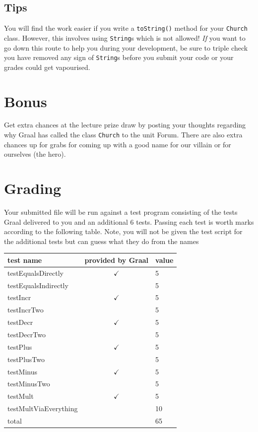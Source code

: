 \documentclass[twoside=false,DIV=14]{scrartcl}
\begin{document}
\subsection{Tips}
You will find the work easier if you write a \verb+toString()+ method for your \verb+Church+ class.  However, this involves using \verb+String+s which is not allowed!  \emph{If} you want to go down this route to help you during your development, be sure to triple check you have removed any sign of \verb+String+s before you submit your code or your grades could get vapourised.

\section{Bonus}
Get extra chances at the lecture prize draw by posting your thoughts regarding why Graal has called the class \lstinline{Church} to the unit Forum.  There are also extra chances up for grabs for coming up with a good name for our villain or for ourselves (the hero).

\section{Grading}
Your submitted file will be run against a test program consisting of the tests Graal delivered to you and an additional 6 tests.  Passing each test is worth marks according to the following table.  Note, you will not be given the test script for the additional tests but can guess what they do from the names

\begin{tabular}{lcl}
  \textbf{test name} & \textbf{provided by Graal} & \textbf{value} \\
  \hline
  testEqualsDirectly & $\checkmark$ & 5 \\
  testEqualsIndirectly & & 5 \\
  testIncr & $\checkmark$ & 5 \\
  testIncrTwo & & 5 \\
  testDecr & $\checkmark$ & 5 \\
  testDecrTwo & & 5 \\
  testPlus & $\checkmark$ & 5 \\
  testPlusTwo & & 5 \\
  testMinus & $\checkmark$ & 5 \\
  testMinusTwo & & 5 \\
  testMult & $\checkmark$ & 5 \\
  testMultViaEverything & & 10 \\
  \hline
  \hline
  total & & 65 \\
  \hline
\end{tabular}
\vspace{2em}
\end{document}
